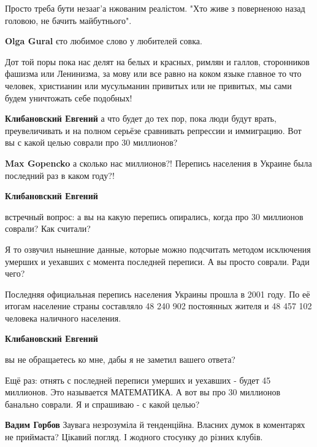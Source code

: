 \begin{itemize}
\begin{itemize}
\begin{itemize}
Просто треба бути незааг'а нжованим реалістом. "Хто живе з поверненою назад
головою, не бачить майбутнього".

\textbf{Olga Gural} єто любимое слово у любителей совка.
\end{itemize} %


Дот той поры пока нас делят на белых и красных, римлян и галлов, сторонников
фашизма или Ленинизма, за мову или все равно на коком языке главное то что
человек, христианин или мусульманин привитых или не привитых, мы сами будем
уничтожать себе подобных!

\begin{itemize} %
\textbf{Клибановский Евгений} а что будет до тех пор, пока люди будут врать, преувеличивать и на полном серьёзе сравнивать репрессии и иммиграцию. Вот вы с какой целью соврали про 30 миллионов?

\textbf{Max Gopencko} а сколько нас миллионов?! Перепись населения в Украине была последний раз в каком году?!

\textbf{Клибановский Евгений} 

встречный вопрос: а вы на какую перепись опирались, когда про 30 миллионов соврали? Как считали?

Я то озвучил нынешние данные, которые можно подсчитать методом исключения
умерших и уехавших с момента последней переписи. А вы просто соврали. Ради
чего?


Последняя официальная перепись населения Украины прошла в 2001 году. По её
итогам население страны составляло 48 240 902 постоянных жителя и 48 457 102
человека наличного населения.

\textbf{Клибановский Евгений} 

вы не обращаетесь ко мне, дабы я не заметил вашего ответа?

Ещё раз: отнять с последней переписи умерших и уехавших - будет 45 миллионов.
Это называется МАТЕМАТИКА. А вот вы про 30 миллионов банально соврали. Я и
спрашиваю - с какой целью?

\end{itemize} %

\textbf{Вадим Горбов}
Заувага незрозуміла й тенденційна. Власних думок в коментарях не приймаєта? Цікавий погляд. І жодного стосунку до різних клубів.


\end{itemize}
\end{itemize}
